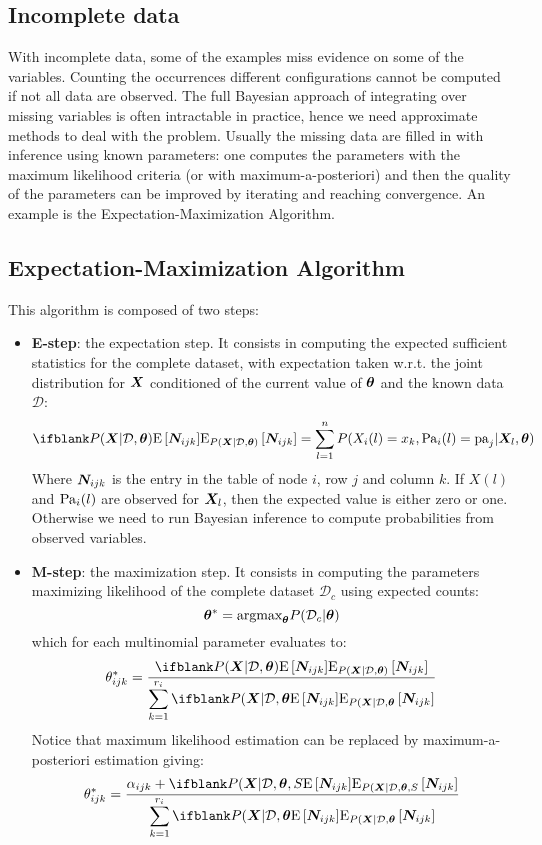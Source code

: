 \subsection{Incomplete data}
With incomplete data, some of the examples miss evidence on some of the variables. Counting the occurrences different configurations cannot be computed if not all data are observed. \newline
The full Bayesian approach of integrating over missing variables is often intractable in practice, hence we need approximate methods to deal with the problem. \newline
Usually the missing data are filled in with inference using known parameters: one computes the parameters with the maximum likelihood criteria (or with maximum-a-posteriori) and then the quality of the parameters can be improved by iterating and reaching convergence. An example is the Expectation-Maximization Algorithm. 
%
\subsection{Expectation-Maximization Algorithm}
This algorithm is composed of two steps:
\begin{itemize}
  \item \textbf{E-step}: the expectation step. It consists in computing the expected sufficient statistics for the complete dataset, with expectation taken w.r.t. the joint distribution for $\bm{X}$ conditioned of the current value of $\bm{\theta}$ and the known data $\mathcal{D}$:
    \[\E[P(\vect{X}\vert\mathcal{D},\vect{\theta})]{\vect{N}_{ijk}}=\Sum_{l=1}^nP(X_i(l)=x_k,\Pa{i}(l)=\text{pa}_j\vert\vect{X}_l,\vect{\theta})\]
    Where $\bm{N}_{ijk}$ is the entry in the table of node $i$, row $j$ and column $k$. \newline
    If $X(l)$ and $\text{Pa}_{i}(l)$ are observed for $\bm{X}_l$, then the expected value is either zero or one. Otherwise we need to run Bayesian inference to compute probabilities from observed variables. 
  \item \textbf{M-step}: the maximization step. It consists in computing the parameters maximizing likelihood of the complete dataset $\mathcal{D}_c$ using expected counts:
    \[\bm{\theta}^*=\text{argmax}_{\bm{\theta}}P(\mathcal{D}_c\vert\bm{\theta})\]
    which for each multinomial parameter evaluates to:
    \[\theta_{ijk}^*=\frac{\E[P(\vect{X}\vert\mathcal{D},\vect{\theta})]{\vect{N}_{ijk}}}{\Sum_{k=1}^{r_i}\E[P(\vect{X}\vert\mathcal{D},\vect{\theta}]{\vect{N}_{ijk}}}\]
    Notice that maximum likelihood estimation can be replaced by maximum-a-posteriori estimation giving:
    \[\theta_{ijk}^*=\dfrac{\alpha_{ijk}+\E[P(\vect{X}\vert\mathcal{D},\vect{\theta},S]{\vect{N}_{ijk}}}{\Sum_{k=1}^{r_i}\E[P(\vect{X}\vert\mathcal{D},\vect{\theta}]{\vect{N}_{ijk}}}\]
\end{itemize}
%
%
%
